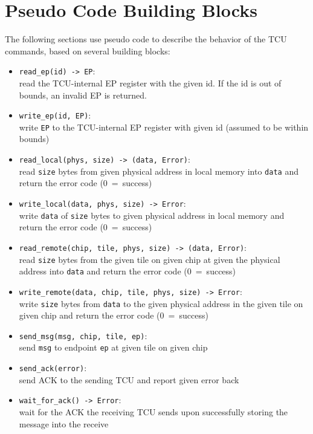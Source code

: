 \section{Pseudo Code Building Blocks}
\label{sec:unprivcmdspseudo}

The following sections use pseudo code to describe the behavior of the TCU commands, based on
several building blocks:

\begin{itemize}
  \item \texttt{read\_ep(id) -> EP}:\\
  read the TCU-internal EP register with the given id. If the id is out of bounds, an invalid EP is
  returned.
  \item \texttt{write\_ep(id, EP)}:\\
  write \texttt{EP} to the TCU-internal EP register with given id (assumed to be within bounds)
  \item \texttt{read\_local(phys, size) -> (data, Error)}:\\
  read \texttt{size} bytes from given physical address in local memory into \texttt{data} and
  return the error code (0~=~success)
  \item \texttt{write\_local(data, phys, size) -> Error}:\\
  write \texttt{data} of \texttt{size} bytes to given physical address in local memory and
  return the error code (0~=~success)
  \item \texttt{read\_remote(chip, tile, phys, size) -> (data, Error)}:\\
  read \texttt{size} bytes from the given tile on given chip at given the physical address into
  \texttt{data} and return the error code (0~=~success)
  \item \texttt{write\_remote(data, chip, tile, phys, size) -> Error}:\\
  write \texttt{size} bytes from \texttt{data} to the given physical address in the given tile on
  given chip and return the error code (0~=~success)
  \item \texttt{send\_msg(msg, chip, tile, ep)}:\\
  send \texttt{msg} to endpoint \texttt{ep} at given tile on given chip
  \item \texttt{send\_ack(error)}:\\
  send ACK to the sending TCU and report given error back
  \item \texttt{wait\_for\_ack() -> Error}:\\
  wait for the ACK the receiving TCU sends upon successfully storing the message into the receive

\end{itemize}
